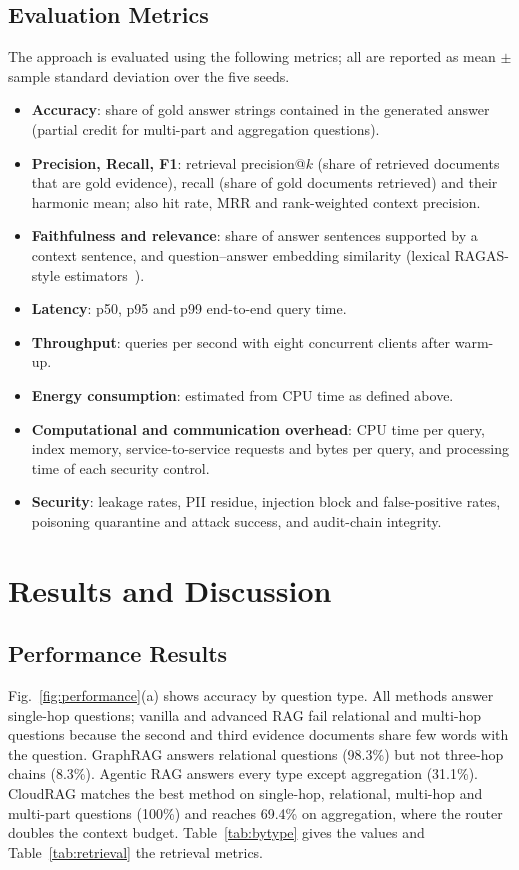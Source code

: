 \documentclass[journal]{IEEEtran}
\begin{document}


\subsection{Evaluation Metrics}
\label{sec:metrics}
The approach is evaluated using the following metrics; all are reported as mean $\pm$ sample standard
deviation over the five seeds.
\begin{itemize}
    \item \textbf{Accuracy}: share of gold answer strings contained in the generated answer (partial
          credit for multi-part and aggregation questions).
    \item \textbf{Precision, Recall, F1}: retrieval precision@$k$ (share of retrieved documents that are
          gold evidence), recall (share of gold documents retrieved) and their harmonic mean; also hit
          rate, MRR and rank-weighted context precision.
    \item \textbf{Faithfulness and relevance}: share of answer sentences supported by a context sentence,
          and question--answer embedding similarity (lexical RAGAS-style estimators~\cite{es2024ragas}).
    \item \textbf{Latency}: p50, p95 and p99 end-to-end query time.
    \item \textbf{Throughput}: queries per second with eight concurrent clients after warm-up.
    \item \textbf{Energy consumption}: estimated from CPU time as defined above.
    \item \textbf{Computational and communication overhead}: CPU time per query, index memory,
          service-to-service requests and bytes per query, and processing time of each security control.
    \item \textbf{Security}: leakage rates, PII residue, injection block and false-positive rates,
          poisoning quarantine and attack success, and audit-chain integrity.
\end{itemize}

\section{Results and Discussion}

\subsection{Performance Results}
Fig.~\ref{fig:performance}(a) shows accuracy by question type. All methods answer single-hop questions;
vanilla and advanced RAG fail relational and multi-hop questions because the second and third evidence
documents share few words with the question. GraphRAG answers relational questions (98.3\%) but not
three-hop chains (8.3\%). Agentic RAG answers every type except aggregation (31.1\%). CloudRAG matches the
best method on single-hop, relational, multi-hop and multi-part questions (100\%) and reaches 69.4\% on
aggregation, where the router doubles the context budget. Table~\ref{tab:bytype} gives the values and
Table~\ref{tab:retrieval} the retrieval metrics.
\end{document}

